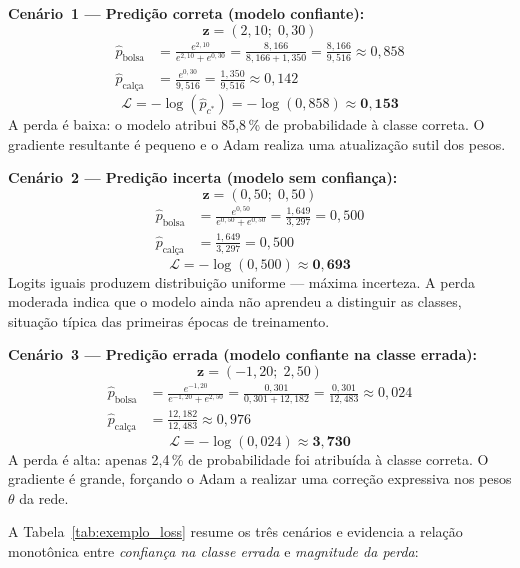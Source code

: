 \documentclass[12pt,a4paper]{article}
\begin{document}
\vspace{0.8em}
\noindent\textbf{Cenário~1 --- Predição correta (modelo confiante):}
\[
  \mathbf{z} = (2{,}10;\; 0{,}30)
\]
\begin{align*}
  \hat{p}_{\text{bolsa}}
    &= \frac{e^{2{,}10}}{e^{2{,}10}+e^{0{,}30}}
     = \frac{8{,}166}{8{,}166 + 1{,}350}
     = \frac{8{,}166}{9{,}516}
     \approx 0{,}858 \\[6pt]
  \hat{p}_{\text{calça}}
    &= \frac{e^{0{,}30}}{9{,}516}
     = \frac{1{,}350}{9{,}516}
     \approx 0{,}142
\end{align*}
\[
  \mathcal{L} = -\log(\hat{p}_{c^*}) = -\log(0{,}858) \approx \mathbf{0{,}153}
\]
A perda é baixa: o modelo atribui 85,8\,\% de probabilidade à classe
correta. O gradiente resultante é pequeno e o Adam realiza uma atualização
sutil dos pesos.

\vspace{0.8em}
\noindent\textbf{Cenário~2 --- Predição incerta (modelo sem confiança):}
\[
  \mathbf{z} = (0{,}50;\; 0{,}50)
\]
\begin{align*}
  \hat{p}_{\text{bolsa}}
    &= \frac{e^{0{,}50}}{e^{0{,}50}+e^{0{,}50}}
     = \frac{1{,}649}{3{,}297}
     = 0{,}500 \\[6pt]
  \hat{p}_{\text{calça}}
    &= \frac{1{,}649}{3{,}297}
     = 0{,}500
\end{align*}
\[
  \mathcal{L} = -\log(0{,}500) \approx \mathbf{0{,}693}
\]
Logits iguais produzem distribuição uniforme --- máxima incerteza.
A perda moderada indica que o modelo ainda não aprendeu a distinguir
as classes, situação típica das primeiras épocas de treinamento.

\vspace{0.8em}
\noindent\textbf{Cenário~3 --- Predição errada (modelo confiante na classe errada):}
\[
  \mathbf{z} = (-1{,}20;\; 2{,}50)
\]
\begin{align*}
  \hat{p}_{\text{bolsa}}
    &= \frac{e^{-1{,}20}}{e^{-1{,}20}+e^{2{,}50}}
     = \frac{0{,}301}{0{,}301 + 12{,}182}
     = \frac{0{,}301}{12{,}483}
     \approx 0{,}024 \\[6pt]
  \hat{p}_{\text{calça}}
    &= \frac{12{,}182}{12{,}483}
     \approx 0{,}976
\end{align*}
\[
  \mathcal{L} = -\log(0{,}024) \approx \mathbf{3{,}730}
\]
A perda é alta: apenas 2,4\,\% de probabilidade foi atribuída à classe
correta. O gradiente é grande, forçando o Adam a realizar uma correção
expressiva nos pesos $\theta$ da rede.

\vspace{1em}
A Tabela~\ref{tab:exemplo_loss} resume os três cenários e evidencia a
relação monotônica entre \emph{confiança na classe errada} e \emph{magnitude da perda}:
\end{document}
